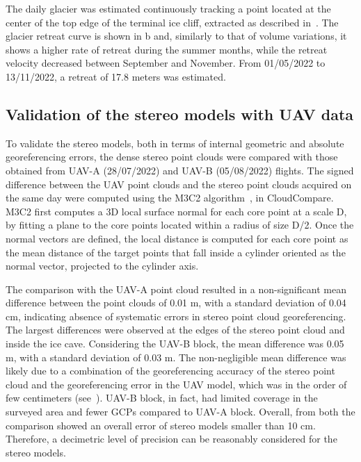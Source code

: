 The daily glacier was estimated continuously tracking a point located at the center of
the top edge of the terminal ice cliff, extracted as described in~.
The glacier retreat curve is shown in b and, similarly to that of
volume variations, it shows a higher rate of retreat during the summer months, while the
retreat velocity
decreased between September and November.
From 01/05/2022 to 13/11/2022, a retreat of 17.8 meters was estimated.


\subsection{Validation of the stereo models with UAV data}\label{sec:4:res_uav_validation}

To validate the stereo models, both in terms of internal geometric and absolute
georeferencing errors, the dense stereo point clouds were compared with those obtained
from UAV-A (28/07/2022) and UAV-B (05/08/2022) flights.
The signed difference between the UAV point clouds and the stereo point clouds acquired
on the same day were computed using the M3C2 algorithm~\citep{lague2013accurate}, in
CloudCompare.
M3C2 first computes a 3D local surface normal for each core point at a scale
D, by fitting a plane to the core points located within a radius of size D/2.
Once the normal vectors are defined, the local distance is computed for each core point
as the mean distance of the target points that fall inside a cylinder oriented as the
normal vector, projected to the cylinder axis.

The comparison with the UAV-A point cloud resulted in a non-significant mean difference
between the point clouds of 0.01 m, with a standard deviation of 0.04 cm, indicating
absence of systematic errors in stereo point cloud georeferencing.
The largest differences were observed at the edges of the stereo point cloud and inside
the ice cave. %
Considering the UAV-B block, the mean difference was 0.05 m, with a standard deviation of
0.03 m.
The non-negligible mean difference was likely due to a combination of the georeferencing
accuracy of the stereo point cloud and the georeferencing error in the UAV model, which
was in the order of few centimeters (see~).
UAV-B block, in fact, had limited coverage in the surveyed area and fewer GCPs
compared to UAV-A block.
Overall, from both the comparison showed an overall error of stereo models smaller than
10 cm.
Therefore, a decimetric level of precision can be reasonably considered for the stereo
models.

